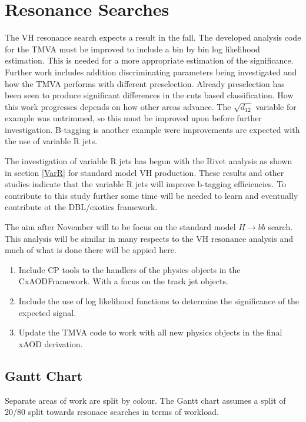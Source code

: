 \section{Resonance Searches}
The VH resonance search expects a result in the fall. The developed analysis code for the TMVA must be improved to include a bin by bin log likelihood estimation. This is needed for a more appropriate estimation of the significance. Further work includes addition discriminating parameters being investigated and how the TMVA performs with different preselection. Already preselection has been seen to produce significant differences in the cuts based classification. How this work progresses depends on how other areas advance. The $\sqrt{d_{12}}$ variable for example was untrimmed, so this must be improved upon before further investigation. B-tagging is another example were improvements are expected with the use of variable R jets.          

The investigation of variable R jets has begun with the Rivet analysis as shown in section \ref{VarR} for standard model VH production. These results and other studies indicate that the variable R jets will improve b-tagging efficiencies. To contribute to this study further some time will be needed to learn and eventually contribute ot the DBL/exotics framework.

The aim after November will to be focus on the standard model $H\rightarrow bb$ search. This analysis will be similar in many respects to the VH resonance analysis and much of what is done there will be appied here.   

\begin{enumerate}

  \item Include CP tools to the handlers of the physics objects in the CxAODFramework. With a focus on the track jet objects. 
  \item Include the use of log likelihood functions to determine the significance of the expected signal. 
   \item Update the TMVA code to work with all new physics objects in the final xAOD derivation. 

\end{enumerate}

\newpage
\appendix
\subsection{Gantt Chart}
Separate areas of work are split by colour. The Gantt chart assumes a split of 20/80 split towards resonace searches in terms of workload.    

